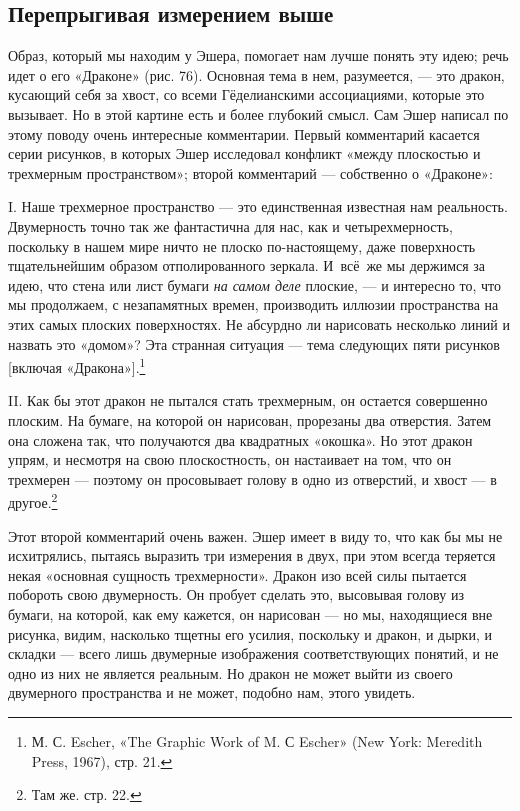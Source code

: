 \documentclass[../main.tex]{subfiles}
\begin{document}
\subsection{Перепрыгивая измерением выше}

Образ, который мы находим у Эшера, помогает нам лучше понять эту идею; речь идет о его «Драконе» (рис. 76). Основная тема в нем, разумеется, --- это дракон, кусающий себя за хвост, со всеми Гёделианскими ассоциациями, которые это вызывает. Но в этой картине есть и более глубокий смысл. Сам Эшер написал по этому поводу очень интересные комментарии. Первый комментарий касается серии рисунков, в которых Эшер исследовал конфликт «между плоскостью и трехмерным пространством»; второй комментарий --- собственно о «Драконе»:

I. Наше трехмерное пространство --- это единственная известная нам реальность. Двумерность точно так же фантастична для нас, как и четырехмерность, поскольку в нашем мире ничто не плоско по-настоящему, даже поверхность тщательнейшим образом отполированного зеркала. И~всё~же мы держимся за идею, что стена или лист бумаги \emph{на самом деле} плоские, --- и интересно то, что мы продолжаем, с незапамятных времен, производить иллюзии пространства на этих самых плоских поверхностях. Не абсурдно ли нарисовать несколько линий и назвать это «домом»? Эта странная ситуация --- тема следующих пяти рисунков {[}включая «Дракона»{]}.\footnote{М. С. Escher, «The Graphic Work of M. С Escher» (New York: Meredith Press, 1967), стр. 21.}

II. Как бы этот дракон не пытался стать трехмерным, он остается совершенно плоским. На бумаге, на которой он нарисован, прорезаны два отверстия. Затем она сложена так, что получаются два квадратных «окошка». Но этот дракон упрям, и несмотря на свою плоскостность, он настаивает на том, что он трехмерен --- поэтому он просовывает голову в одно из отверстий, и хвост --- в другое.\footnote{Там же. стр. 22.}

Этот второй комментарий очень важен. Эшер имеет в виду то, что как бы мы не исхитрялись, пытаясь выразить три измерения в двух, при этом всегда теряется некая «основная сущность трехмерности». Дракон изо всей силы пытается побороть свою двумерность. Он пробует сделать это, высовывая голову из бумаги, на которой, как ему кажется, он нарисован --- но мы, находящиеся вне рисунка, видим, насколько тщетны его усилия, поскольку и дракон, и дырки, и складки --- всего лишь двумерные изображения соответствующих понятий, и не одно из них не является реальным. Но дракон не может выйти из своего двумерного пространства и не может, подобно нам, этого увидеть.
\end{document}
